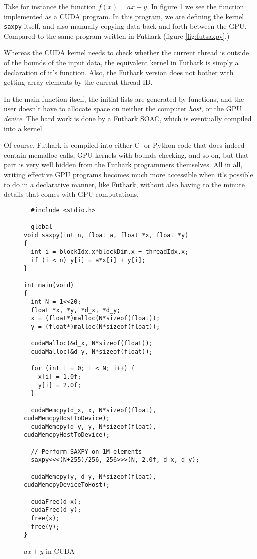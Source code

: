 Take for instance the function $f(x) = ax+y$. In figure \ref{fig:cudasaxpy} we see the
function implemented as a CUDA program. In this program, we are defining the
kernel \texttt{saxpy} itself, and also manually copying data back and forth
between the GPU.
Compared to the same program written in Futhark (figure \ref{fig:futsaxpy}.)

Whereas the CUDA kernel needs to check whether the current thread is outside of
the bounds of the input data, the equivalent kernel in Futhark is simply a
declaration of it's function. Also, the Futhark version does not bother with
getting array elements by the current thread ID.

In the main function itself, the initial lists are generated by functions, and
the user doesn't have to allocate space on neither the computer \textit{host},
or the GPU \textit{device}.
The hard work is done by a Futhark SOAC, which is eventually compiled into a
kernel  %

Of course, Futhark is compiled into either C- or Python code that does indeed
contain memalloc calls, GPU kernels with bounds checking, and so on, but that
part is very well hidden from the Futhark programmers themselves.
All in all, writing effective GPU programs becomes much more accessible when it's
possible to do in a declarative manner, like Futhark, without also having to
the minute details that comes with GPU computations.
\begin{figure}
  \centering
\begin{verbatim}
  #include <stdio.h>

__global__
void saxpy(int n, float a, float *x, float *y)
{
  int i = blockIdx.x*blockDim.x + threadIdx.x;
  if (i < n) y[i] = a*x[i] + y[i];
}

int main(void)
{
  int N = 1<<20;
  float *x, *y, *d_x, *d_y;
  x = (float*)malloc(N*sizeof(float));
  y = (float*)malloc(N*sizeof(float));

  cudaMalloc(&d_x, N*sizeof(float)); 
  cudaMalloc(&d_y, N*sizeof(float));

  for (int i = 0; i < N; i++) {
    x[i] = 1.0f;
    y[i] = 2.0f;
  }

  cudaMemcpy(d_x, x, N*sizeof(float), cudaMemcpyHostToDevice);
  cudaMemcpy(d_y, y, N*sizeof(float), cudaMemcpyHostToDevice);

  // Perform SAXPY on 1M elements
  saxpy<<<(N+255)/256, 256>>>(N, 2.0f, d_x, d_y);

  cudaMemcpy(y, d_y, N*sizeof(float), cudaMemcpyDeviceToHost);

  cudaFree(d_x);
  cudaFree(d_y);
  free(x);
  free(y);
}
\end{verbatim}
  \caption{$ax + y$ in CUDA}
  \label{fig:cudasaxpy}
\end{figure}

